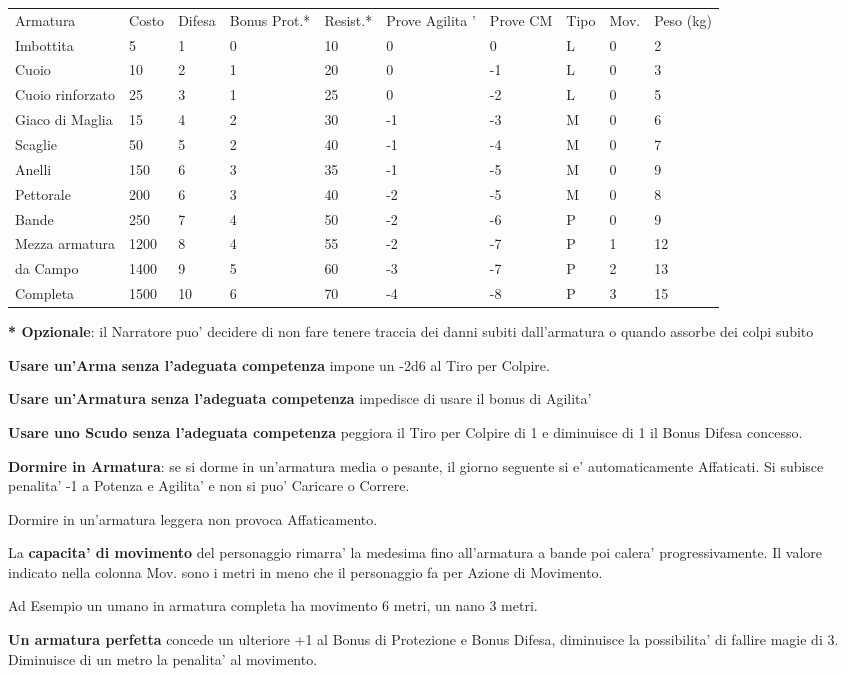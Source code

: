 \documentclass[a4paper,11pt,twoside,openany]{dndbook}
\begin{document}
{\label{tabella-armature}
{\small
\begin{tabular}[c]{@{}llllllllll@{}}
\toprule 
Armatura &Costo & Difesa & Bonus Prot.* & Resist.* & Prove Agilita ’ & Prove CM & Tipo & Mov.& Peso (kg)\tabularnewline
Imbottita & 5 & 1 & 0 & 10 & 0 & 0 & L & 0 & 2\tabularnewline
Cuoio & 10 & 2 & 1 & 20 & 0 & -1 & L & 0 & 3\tabularnewline
Cuoio rinforzato & 25 & 3 & 1 & 25 & 0 & -2 & L & 0 & 5\tabularnewline
Giaco di Maglia & 15 & 4 & 2 & 30 & -1 & -3 & M & 0 & 6\tabularnewline
Scaglie & 50 & 5 & 2 & 40 & -1 & -4 & M & 0 & 7\tabularnewline
Anelli & 150 & 6 & 3 & 35 & -1 & -5 & M & 0 & 9\tabularnewline
Pettorale & 200 & 6 & 3 & 40 & -2 & -5 & M & 0 & 8\tabularnewline
Bande & 250 & 7 & 4 & 50 & -2 & -6 & P & 0 & 9\tabularnewline
Mezza armatura & 1200 & 8 & 4 & 55 & -2 & -7 & P & 1 & 12\tabularnewline
da Campo & 1400 & 9 & 5 & 60 & -3 & -7 & P & 2 & 13\tabularnewline
Completa & 1500 & 10 & 6 & 70 & -4 & -8 & P & 3 & 15\tabularnewline
\bottomrule
\end{tabular}}

\textbf{{*} Opzionale}: il Narratore puo' decidere di non fare tenere traccia dei danni subiti dall'armatura o quando assorbe dei colpi subito

\bigskip

\textbf{Usare un'Arma senza l'adeguata competenza} impone un -2d6 al Tiro per Colpire.

\textbf{Usare un'Armatura senza l'adeguata competenza} impedisce di usare il bonus di Agilita'

\textbf{Usare uno Scudo senza l'adeguata competenza} peggiora il Tiro per Colpire di 1 e diminuisce di 1 il Bonus Difesa concesso.

\textbf{Dormire in Armatura}: se si dorme in un'armatura media o pesante, il giorno seguente si e' automaticamente Affaticati. Si subisce penalita' -1 a Potenza e Agilita' e non si puo' Caricare o Correre.

Dormire in un'armatura leggera non provoca Affaticamento.

La \textbf{capacita' di movimento} del personaggio rimarra' la medesima fino all'armatura a bande poi calera' progressivamente. Il valore indicato nella colonna Mov. sono i metri in meno che il personaggio fa per Azione di Movimento.

Ad Esempio un umano in armatura completa ha movimento 6 metri, un nano 3 metri. 

\textbf{Un armatura perfetta} concede un ulteriore +1 al Bonus di Protezione e Bonus Difesa, diminuisce la possibilita' di fallire magie di 3. Diminuisce di un metro la penalita' al movimento. 

}
\end{document}
